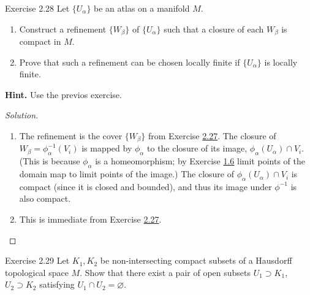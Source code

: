 \begin{thing4}{Exercise 2.28}\label{exer:2.28}\leavevmode
Let \(\{U_\alpha\}\) be an atlas on a manifold \(M\).
\begin{enumerate}[label=(\alph*)]
\item Construct a refinement \(\{W_\beta\}\) of \(\{U_\alpha\}\) such that a closure of each \(W_\beta\) is compact in \(M\).
\item Prove that such a refinement can be chosen locally finite if \(\{U_\alpha\}\) is locally finite.
\end{enumerate}
\textbf{Hint.} Use the previos exercise.
\end{thing4}

\begin{proof}[Solution]\leavevmode
\begin{enumerate}[label=(\alph*)]
\item The refinement is the cover \(\{W_\beta\}\) from Exercise \hyperref[exer:2.27]{2.27}. 
The closure of \(W_\beta=\phi^{-1}_\alpha(V_i)\) is mapped by \(\phi_\alpha\) to the closure of its image, \(\phi_\alpha(U_\alpha)\cap V_i\). (This is because  \(\phi_\alpha\) is a homeomorphism; by Exercise \hyperref[exer:1.6]{1.6} limit points of the domain map to limit points of the image.) The closure of \(\phi_\alpha(U_\alpha)\cap V_i\) is compact (since it is closed and bounded), and thus its image under \(\phi^{-1}\) is also compact.

\item This is immediate from Exercise \hyperref[exer:2.27]{2.27}.
\end{enumerate}
\end{proof}

\begin{thing4}{Exercise 2.29}\label{exer:2.29}\leavevmode
Let \(K_1, K_2\) be non-intersecting compact subsets of a Hausdorff topological space \(M\). Show that there exist a pair of open subsets \(U_1 \supset K_1\), \(U_2 \supset K_2\) satisfying \(U_1 \cap U_2=\varnothing\).
\end{thing4}

